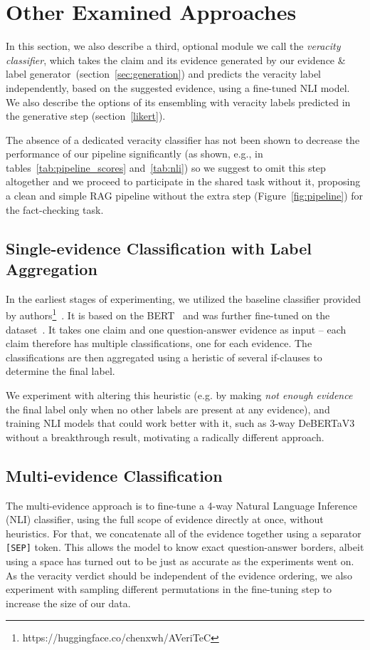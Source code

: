 \section{Other Examined Approaches}
In this section, we also describe a third, optional module we call the \textit{veracity classifier}, which takes the claim and its evidence generated by our evidence \& label generator~(section~\ref{sec:generation}) and predicts the veracity label independently, based on the suggested evidence, using a fine-tuned NLI model.
We also describe the options of its ensembling with veracity labels predicted in the generative step (section~\ref{likert}).

The absence of a dedicated veracity classifier has not been shown to decrease the performance of our pipeline significantly (as shown, e.g., in tables~\ref{tab:pipeline_scores} and~\ref{tab:nli}) so we suggest to omit this step altogether and we proceed to participate in the \averitec{}  shared task without it, proposing a clean and simple RAG pipeline without the extra step (Figure~\ref{fig:pipeline}) for the fact-checking task.

\subsection{Single-evidence Classification with Label Aggregation}
In the earliest stages of experimenting, we utilized the baseline classifier provided by \averitec{} authors\footnote{https://huggingface.co/chenxwh/AVeriTeC}~\cite{averitec2024}.
It is based on the BERT~\cite{devlin-etal-2019-bert} and was further fine-tuned on the \averitec{}  dataset~\cite{averitec2024}. 
It takes one claim and one question-answer evidence as input -- each claim therefore has multiple classifications, one for each evidence. The classifications are then aggregated using a heristic of several if-clauses to determine the final label. 

We experiment with altering this heuristic (e.g. by making \textit{not enough evidence} the final label only when no other labels are present at any evidence), and training NLI models that could work better with it, such as 3-way DeBERTaV3~\cite{he2023debertav3improvingdebertausing} without a breakthrough result, motivating a radically different approach.

\subsection{Multi-evidence Classification}
\label{subsubsec:concatenation}
The multi-evidence approach is to fine-tune a 4-way Natural Language Inference (NLI) classifier, using the full scope of evidence directly at once, without heuristics.
For that, we concatenate all of the evidence together using a separator \texttt{[SEP]} token. This allows the model to know exact question-answer borders, albeit using a space has turned out to be just as accurate as the experiments went on. As the veracity verdict should be independent of the evidence ordering, we also experiment with sampling different permutations in the fine-tuning step to increase the size of our data.

